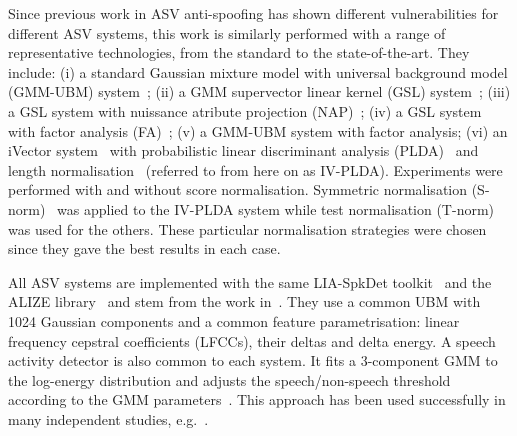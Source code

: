 
Since previous work in ASV anti-spoofing has shown different vulnerabilities for different ASV systems, this work is similarly performed with a range of representative technologies, from the standard to the state-of-the-art.
They include: 
(i) a standard Gaussian mixture model with universal background model (GMM-UBM) system~{\bfseries \cite{Reynolds2000}};
(ii) a GMM supervector linear kernel (GSL) system~{\bfseries  \cite{Campbell2006b}};
(iii) a GSL system with nuissance atribute projection (NAP)~\cite{Campbell2006};
(iv) a GSL system with factor analysis (FA)~\cite{Fauve2007};
(v) a GMM-UBM system with factor analysis;
(vi) an iVector system~\cite{Dehak2011} with probabilistic linear discriminant analysis (PLDA)~\cite{Li2012} and length normalisation~\cite{Garcia2011} (referred to from here on as IV-PLDA). 
Experiments were performed with and without score normalisation.  
Symmetric normalisation (S-norm)~\cite{Kenny2010} was applied to the IV-PLDA system while test normalisation (T-norm)~\cite{Auckenthaler2000} was used for the others.  These particular normalisation strategies were chosen since they gave the best results in each case. 

All ASV systems are implemented with the same LIA-SpkDet toolkit~\cite{Bonastre2008} and the ALIZE library~\cite{Bonastre2004} and stem from the work in~\cite{Fauve2007}.
They use a common UBM with 1024 Gaussian components and a common feature parametrisation: linear frequency cepstral coefficients (LFCCs), their deltas and delta energy. 
A speech activity detector is also common to each system.  
It fits a 3-component GMM to the log-energy distribution and adjusts the speech/non-speech threshold according to the GMM parameters~\cite{Bimbot2004}.
This approach has been used successfully in many independent studies, e.g.~\cite{fauve2008}. 
